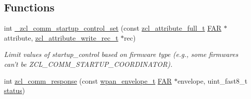 \subsection*{Functions}
\begin{DoxyCompactItemize}
\item 
int \hyperlink{group__zcl__commissioning_gae3180284d1a5a9af2176173a58cc1f4c}{\-\_\-zcl\-\_\-comm\-\_\-startup\-\_\-control\-\_\-set} (const \hyperlink{structzcl__attribute__full__t}{zcl\-\_\-attribute\-\_\-full\-\_\-t} \hyperlink{group__hal_gaef060b3456fdcc093a7210a762d5f2ed}{F\-A\-R} $\ast$attribute, \hyperlink{structzcl__attribute__write__rec__t}{zcl\-\_\-attribute\-\_\-write\-\_\-rec\-\_\-t} $\ast$rec)
\begin{DoxyCompactList}\small\item\em Limit values of startup\-\_\-control based on firmware type (e.\-g., some firmwares can't be Z\-C\-L\-\_\-\-C\-O\-M\-M\-\_\-\-S\-T\-A\-R\-T\-U\-P\-\_\-\-C\-O\-O\-R\-D\-I\-N\-A\-T\-O\-R). \end{DoxyCompactList}\item 
\hypertarget{group__zcl__commissioning_ga57f9aaf3da6dc9b513f7f9ccbb473a0b}{int \hyperlink{group__zcl__commissioning_ga57f9aaf3da6dc9b513f7f9ccbb473a0b}{zcl\-\_\-comm\-\_\-response} (const \hyperlink{structwpan__envelope__t}{wpan\-\_\-envelope\-\_\-t} \hyperlink{group__hal_gaef060b3456fdcc093a7210a762d5f2ed}{F\-A\-R} $\ast$envelope, uint\-\_\-fast8\-\_\-t \hyperlink{group__xbee__atcmd_gade818037fd6c985038ff29656089758d}{status})}\label{group__zcl__commissioning_ga57f9aaf3da6dc9b513f7f9ccbb473a0b}


\end{DoxyCompactItemize}
